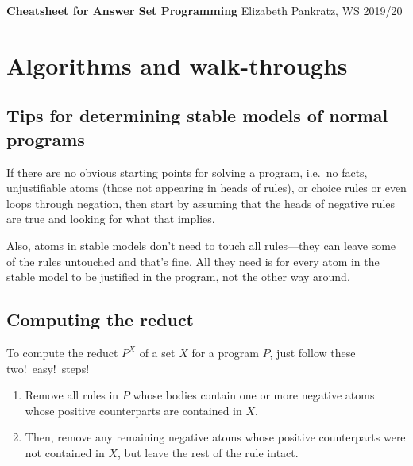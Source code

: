 \documentclass[9pt,a4paper,landscape]{article}
\begin{document}
	
	
{\small
	
\textbf{Cheatsheet for Answer Set Programming} \hfill Elizabeth Pankratz, WS 2019/20
	
\section{Algorithms and walk-throughs}

\vspace{\baselineskip}


\subsection{Tips for determining stable models of normal programs}

If there are no obvious starting points for solving a program, i.e.\ no facts, unjustifiable atoms (those not appearing in heads of rules), or choice rules or even loops through negation, then start by assuming that the heads of negative rules are true and looking for what that implies. 

Also, atoms in stable models don't need to touch all rules---they can leave some of the rules untouched and that's fine. All they need is for every atom in the stable model to be justified in the program, not the other way around.

\vspace{\baselineskip}


\subsection{Computing the reduct}
\label{subsec:reduct}

To compute the reduct $P^X$ of a set $X$ for a program $P$, just follow these two!\ easy!\ steps!

\begin{enumerate}[noitemsep]
	\item Remove all rules in $P$ whose bodies contain one or more negative atoms whose positive counterparts are contained in $X$.
	\item Then, remove any remaining negative atoms whose positive counterparts were not contained in $X$, but leave the rest of the rule intact.
\end{enumerate}

}
\end{document}
